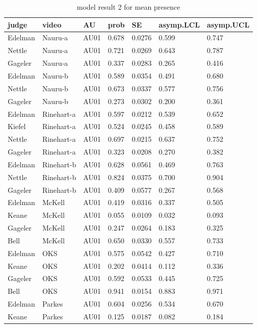 \documentclass{monashthesis}
\begin{document}
\begin{center}
\begin{longtable}{lllllll}
\caption{\label{tab:result-2}model result 2 for mean presence}\\
\toprule
judge & video & AU & prob & SE & asymp.LCL & asymp.UCL \\
\midrule
\endhead
\bottomrule
\endfoot
Edelman & Nauru-a & AU01 & 0.678 & 0.0276 & 0.599 & 0.747 \\
Nettle & Nauru-a & AU01 & 0.721 & 0.0269 & 0.643 & 0.787 \\
Gageler & Nauru-a & AU01 & 0.337 & 0.0283 & 0.265 & 0.416 \\
Edelman & Nauru-b & AU01 & 0.589 & 0.0354 & 0.491 & 0.680 \\
Nettle & Nauru-b & AU01 & 0.673 & 0.0337 & 0.577 & 0.756 \\
Gageler & Nauru-b & AU01 & 0.273 & 0.0302 & 0.200 & 0.361 \\
Edelman & Rinehart-a & AU01 & 0.597 & 0.0212 & 0.539 & 0.652 \\
Kiefel & Rinehart-a & AU01 & 0.524 & 0.0245 & 0.458 & 0.589 \\
Nettle & Rinehart-a & AU01 & 0.697 & 0.0215 & 0.637 & 0.752 \\
Gageler & Rinehart-a & AU01 & 0.323 & 0.0208 & 0.270 & 0.382 \\
Edelman & Rinehart-b & AU01 & 0.628 & 0.0561 & 0.469 & 0.763 \\
Nettle & Rinehart-b & AU01 & 0.824 & 0.0375 & 0.700 & 0.904 \\
Gageler & Rinehart-b & AU01 & 0.409 & 0.0577 & 0.267 & 0.568 \\
Edelman & McKell & AU01 & 0.419 & 0.0316 & 0.337 & 0.505 \\
Keane & McKell & AU01 & 0.055 & 0.0109 & 0.032 & 0.093 \\
Gageler & McKell & AU01 & 0.247 & 0.0264 & 0.183 & 0.325 \\
Bell & McKell & AU01 & 0.650 & 0.0330 & 0.557 & 0.733 \\
Edelman & OKS & AU01 & 0.575 & 0.0542 & 0.427 & 0.710 \\
Keane & OKS & AU01 & 0.202 & 0.0414 & 0.112 & 0.336 \\
Gageler & OKS & AU01 & 0.592 & 0.0533 & 0.445 & 0.725 \\
Bell & OKS & AU01 & 0.941 & 0.0154 & 0.883 & 0.971 \\
Edelman & Parkes & AU01 & 0.604 & 0.0256 & 0.534 & 0.670 \\
Keane & Parkes & AU01 & 0.125 & 0.0187 & 0.082 & 0.184 \\

\end{longtable}
\end{center}
\end{document}
